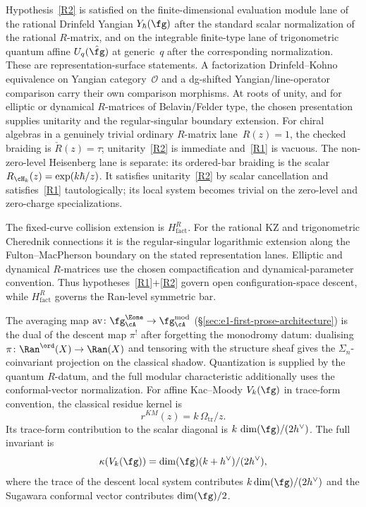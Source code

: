 \begin{remark}
\label{rem:R-descent-unitarity-scope}
Hypothesis~\ref{R2} is satisfied on the finite-dimensional evaluation
module lane of the rational Drinfeld Yangian $Y_\hbar(\fg)$ after the
standard scalar normalization of the rational $R$-matrix, and on the
integrable finite-type lane of trigonometric quantum affine
$U_q(\hat\fg)$ at generic~$q$ after the corresponding normalization.
These are representation-surface statements.  A factorization
Drinfeld--Kohno equivalence on Yangian category~$\mathcal O$ and a
dg-shifted Yangian/line-operator comparison carry their own comparison
morphisms.  At roots of unity, and for elliptic or dynamical
$R$-matrices of Belavin/Felder type, the chosen presentation supplies
unitarity and the regular-singular boundary extension.  For chiral
algebras in a genuinely trivial ordinary
$R$-matrix lane~$R(z)=1$, the checked braiding is $\check R(z)=\tau$;
unitarity~\ref{R2} is immediate and~\ref{R1} is vacuous. The
non-zero-level Heisenberg lane is separate: its ordered-bar braiding is
the scalar $R_{\cH_k}(z)=\exp(k\hbar/z)$. It satisfies
unitarity~\ref{R2} by scalar cancellation and satisfies~\ref{R1}
tautologically; its local system becomes trivial on the zero-level and
zero-charge specializations.

The fixed-curve collision extension is $H_{\mathrm{fact}}^{R}$.  For
the rational KZ and trigonometric Cherednik connections it is the
regular-singular logarithmic extension along the Fulton--MacPherson
boundary on the stated representation lanes.  Elliptic and dynamical
$R$-matrices use the chosen compactification and dynamical-parameter
convention.  Thus hypotheses~\ref{R1}+\ref{R2} govern open
configuration-space descent, while $H_{\mathrm{fact}}^{R}$ governs
the Ran-level symmetric bar.
\end{remark}

\begin{remark}
\label{rem:av-via-descent}
The averaging map
$\mathrm{av}\colon \fg^{\Eone}_\cA \to \fg^{\mathrm{mod}}_\cA$
(\S\ref{sec:e1-first-prose-architecture}) is the dual of the descent
map $\pi^!$ after forgetting the monodromy datum: dualising
$\pi\colon \Ran^{\ord}(X) \to \Ran(X)$ and tensoring with the structure
sheaf gives the $\Sigma_n$-coinvariant projection on the classical
shadow.  Quantization is supplied by the quantum $R$-datum, and the
full modular characteristic additionally uses the conformal-vector
normalization. For affine
Kac--Moody $V_k(\fg)$ in trace-form convention, the classical residue
kernel is
\[
r^{KM}(z)=k\,\Omega_{\mathrm{tr}}/z.
\]
Its trace-form contribution to the scalar diagonal is
$k\,\dim(\fg)/(2h^\vee)$. The full invariant is
\[
\kappa(V_k(\fg))=\dim(\fg)(k+h^\vee)/(2h^\vee),
\]
where the trace of the descent local system contributes
$k\dim(\fg)/(2h^\vee)$ and the Sugawara conformal vector contributes
$\dim(\fg)/2$.
\end{remark}

